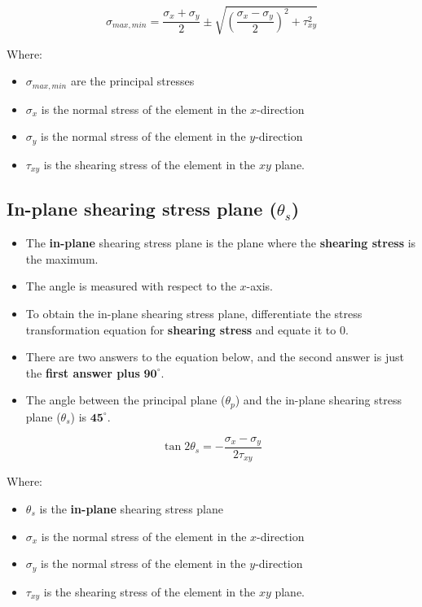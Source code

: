 \documentclass[11pt]{article}
\begin{document}
\[\sigma_{max, min} = \frac{\sigma_x + \sigma_y}{2} \pm \sqrt{\left(\frac{\sigma_x - \sigma_y}{2} \right)^2 + \tau_{xy}^2}\]

Where:
\begin{itemize}
\item \(\sigma_{max, min}\) are the principal stresses
\item \(\sigma_x\) is the normal stress of the element in the \(x\)-direction
\item \(\sigma_y\) is the normal stress of the element in the \(y\)-direction
\item \(\tau_{xy}\) is the shearing stress of the element in the \(xy\) plane.
\end{itemize}

\newpage
\subsection{In-plane shearing stress plane (\(\theta_s\))}
\label{sec:org45d46c8}
\begin{itemize}
\item The \textbf{in-plane} shearing stress plane is the plane where the \textbf{shearing stress} is the maximum.
\item The angle is measured with respect to the \(x\)-axis.
\item To obtain the in-plane shearing stress plane, differentiate the stress transformation equation for \textbf{shearing stress} and equate it to 0.
\item There are two answers to the equation below, and the second answer is just the \textbf{first answer plus} \(\boldsymbol{90^{\circ}}\).
\item The angle between the principal plane (\(\theta_p\)) and the in-plane shearing stress plane (\(\theta_s\)) is \(\boldsymbol{45^{\circ}}\).
\end{itemize}

\[\tan 2 \theta_s = - \frac{\sigma_x - \sigma_y}{2 \tau_{xy}}\]

Where:
\begin{itemize}
\item \(\theta_s\) is the \textbf{in-plane} shearing stress plane
\item \(\sigma_x\) is the normal stress of the element in the \(x\)-direction
\item \(\sigma_y\) is the normal stress of the element in the \(y\)-direction
\item \(\tau_{xy}\) is the shearing stress of the element in the \(xy\) plane.
\end{itemize}
\end{document}
